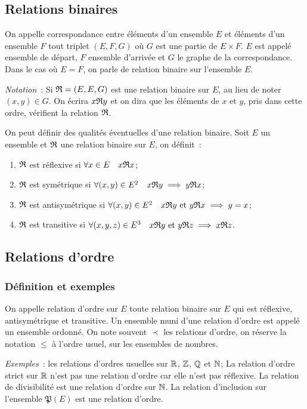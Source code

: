 \subsection{Relations binaires}
\label{chap3-subsec:relationbinaire}
\begin{defdef}
    On appelle correspondance entre éléments d'un ensemble \(E\) et éléments 
    d'un ensemble \(F\) tout triplet \((E,F,G)\) où \(G\) est une partie de \(E 
    \times F\). \(E\) est appelé ensemble de départ, \(F\) ensemble d'arrivée et 
    \(G\) le graphe de la correspondance. Dans le cas où \(E=F\), on parle de 
    relation binaire sur l'ensemble \(E\).
\end{defdef}
\emph{Notation}~: Si \(\mathfrak{R}=(E,E,G)\) est une relation binaire sur \(E\), au 
lieu de noter \((x,y) \in G\). On écrira \(x\mathfrak{R}{}y\) et on dira que les 
éléments de \(x\) et \(y\), pris dans cette ordre, vérifient la relation 
\(\mathfrak{R}\).
\begin{defdef}
    On peut définir des qualités éventuelles d'une relation binaire. Soit \(E\) 
    un ensemble et \(\mathfrak{R}{}\) une relation binaire sur \(E\), on définit~:
    \begin{enumerate}
        \item \(\mathfrak{R}{}\) est réflexive si \(\forall x \in E \quad 
            x\mathfrak{R}{}x\);
        \item \(\mathfrak{R}{}\) est symétrique si \(\forall (x,y) \in E^2 \quad 
            x\mathfrak{R}{}y \implies y\mathfrak{R}{}x\);
        \item \(\mathfrak{R}{}\) est antisymétrique si \(\forall (x,y) \in E^2 \quad 
            x\mathfrak{R}{}y \text{~et~} y\mathfrak{R}{}x \implies y=x\);
        \item \(\mathfrak{R}{}\) est transitive si \(\forall (x,y,z) \in E^3 \quad 
            x\mathfrak{R}{}y \text{~et~} y\mathfrak{R}{}z \implies x\mathfrak{R}{}z\).
    \end{enumerate}
\end{defdef}
\subsection{Relations d'ordre}
\label{chap3-subsec:relationdordre}
\subsubsection{Définition et exemples}
\label{chap3-subsubsec:relationordredef}
\begin{defdef}
    On appelle relation d'ordre sur \(E\) toute relation binaire sur \(E\) qui 
    est réflexive, antisymétrique et transitive. Un ensemble muni d'une relation 
    d'ordre est appelé un ensemble ordonné. On note souvent \(\prec\) les 
    relations d'ordre, on réserve la notation \(\leqslant\) à l'ordre usuel, sur 
    les ensembles de nombres.
\end{defdef}
\emph{Exemples}~: les relations d'ordres usuelles sur \(\mathbb{R}\), \(\mathbb{Z}\), \(\mathbb{Q}\) et 
\(\mathbb{N}\); La relation d'ordre strict sur \(\mathbb{R}\) n'est pas une relation d'ordre car 
elle n'est pas réflexive. La relation de divisibilité est une relation d'ordre 
sur \(\mathbb{N}\). La relation d'inclusion sur l'ensemble \(\mathfrak{P}(E)\) est une 
relation d'ordre.
